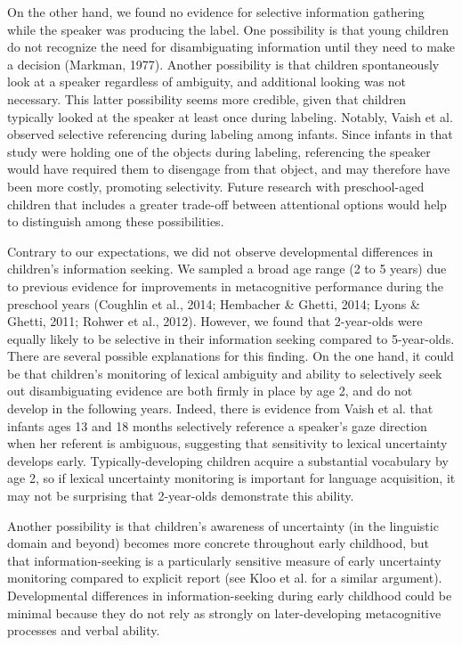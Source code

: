 \documentclass[english,man]{apa6}
\theoremstyle{definition}
\theoremstyle{definition}
\theoremstyle{definition}
\theoremstyle{remark}
\begin{document}
On the other hand, we found no evidence for selective information
gathering while the speaker was producing the label. One possibility is
that young children do not recognize the need for disambiguating
information until they need to make a decision (Markman, 1977). Another
possibility is that children spontaneously look at a speaker regardless
of ambiguity, and additional looking was not necessary. This latter
possibility seems more credible, given that children typically looked at
the speaker at least once during labeling. Notably, Vaish et al.
observed selective referencing during labeling among infants. Since
infants in that study were holding one of the objects during labeling,
referencing the speaker would have required them to disengage from that
object, and may therefore have been more costly, promoting selectivity.
Future research with preschool-aged children that includes a greater
trade-off between attentional options would help to distinguish among
these possibilities.

Contrary to our expectations, we did not observe developmental
differences in children's information seeking. We sampled a broad age
range (2 to 5 years) due to previous evidence for improvements in
metacognitive performance during the preschool years (Coughlin et al.,
2014; Hembacher \& Ghetti, 2014; Lyons \& Ghetti, 2011; Rohwer et al.,
2012). However, we found that 2-year-olds were equally likely to be
selective in their information seeking compared to 5-year-olds. There
are several possible explanations for this finding. On the one hand, it
could be that children's monitoring of lexical ambiguity and ability to
selectively seek out disambiguating evidence are both firmly in place by
age 2, and do not develop in the following years. Indeed, there is
evidence from Vaish et al. that infants ages 13 and 18 months
selectively reference a speaker's gaze direction when her referent is
ambiguous, suggesting that sensitivity to lexical uncertainty develops
early. Typically-developing children acquire a substantial vocabulary by
age 2, so if lexical uncertainty monitoring is important for language
acquisition, it may not be surprising that 2-year-olds demonstrate this
ability.

Another possibility is that children's awareness of uncertainty (in the
linguistic domain and beyond) becomes more concrete throughout early
childhood, but that information-seeking is a particularly sensitive
measure of early uncertainty monitoring compared to explicit report (see
Kloo et al. for a similar argument). Developmental differences in
information-seeking during early childhood could be minimal because they
do not rely as strongly on later-developing metacognitive processes and
verbal ability.
\end{document}
